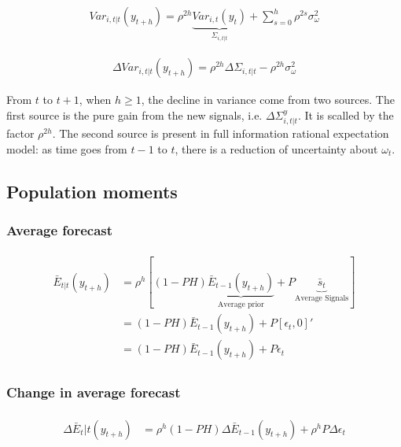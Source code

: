 \documentclass[]{article}
\begin{document}
\begin{eqnarray}
Var_{i,t|t} (y_{t+h}) = \rho^{2h} \underbrace{Var_{i,t}(y_{t})}_{\Sigma_{i,t|t}} + \sum^{h}_{s=0}\rho^{2s} \sigma^2_{\omega}
\end{eqnarray}


\begin{eqnarray}
\Delta Var_{i,t|t} (y_{t+h}) = \rho^{2h}\Delta \Sigma_{i,t|t} - \rho^{2h} \sigma^2_{\omega}
\end{eqnarray}

From $t$ to $t+1$, when $h\geq 1$, the decline in variance come from two sources. The first source is the pure gain from the new signals, i.e. $\Delta \Sigma^y_{i,t|t}$. It is scalled by the factor $\rho^{2h}$. The second source is present in full information rational expectation model: as time goes from $t-1$ to $t$, there is a reduction of uncertainty about $\omega_t$.

\subsection{Population moments}

\subsubsection{Average forecast}


\begin{eqnarray}
\begin{aligned}
\bar E_{t|t} (y_{t+h}) & = \rho^h [(1-PH) \underbrace{\bar E_{t-1}(y_{t+h})}_{\text{Average prior}} + P \underbrace{\bar s_{t}}_{\text{Average Signals}}] \\
& = (1-PH) \bar E_{t-1}(y_{t+h}) + P [\epsilon_t, 0]' \\
& = (1-PH) \bar E_{t-1}(y_{t+h}) + P \epsilon_t
\end{aligned}
\end{eqnarray}

\subsubsection{Change in average forecast}

\begin{eqnarray}
\begin{aligned}
\Delta \bar E_t|t (y_{t+h}) & = \rho^h (1-PH) \Delta \bar E_{t-1}(y_{t+h}) + \rho^h P \Delta \epsilon_t
\end{aligned}
\end{eqnarray}
\end{document}
